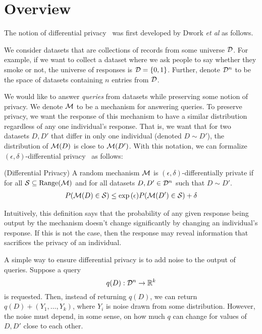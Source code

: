 \documentclass{article} %
\begin{document}
\section{Overview}\label{overview}
The notion of differential privacy~\cite{dwork2006calibrating} was first
developed by Dwork \emph{et al} as follows.


We consider datasets that are collections of records from some universe $\mathcal{D}$.
For example, if we want to collect a dataset where we ask people to say whether
they smoke or not, the universe of responses is $\mathcal{D} = \{0, 1\}$. Further,
denote $\mathcal{D}^n$ to be the space of datasets containing $n$ entries from $\mathcal{D}$.

We would like to answer \textit{queries} from datasets while preserving some
notion of privacy. We denote $\mathcal{M}$ to be a mechanism for answering
queries. To preserve privacy, we want the response of this mechanism
to have a similar distribution regardless of any one individual's response.
That is, we want that for two datasets $D, D'$ that differ in only one
individual (denoted $D \sim D'$), the distribution of $\mathcal{M}(D)$ is close to
$\mathcal{M}(D')$. With this notation, we can formalize $(\epsilon,
\delta)$-differential privacy~\cite{dwork2014algorithmic} as follows:

\begin{definition}{(Differential Privacy)}
A random mechanism $\mathcal{M}$ is $(\epsilon, \delta)$-differentially private
if for all $\mathcal{S} \subseteq \textup{Range}(\mathcal{M})$ and for all
datasets $D, D' \in \mathcal{D}^n$ such that $D \sim D'$.
\begin{align*}
P(\mathcal{M}(D) \in \mathcal{S}) \leq \exp{(\epsilon)} P(\mathcal{M}(D') \in \mathcal{S}) + \delta
\end{align*}
\end{definition}

Intuitively, this definition says that the probability of any given response
being output by the mechanism doesn't change significantly by changing an
individual's response. If this is not the case, then the response may reveal
information that sacrifices the privacy of an individual.

A simple way to ensure differential privacy is to add noise to the
output of queries. Suppose a query
\[ q(D) : \mathcal{D}^n \rightarrow \mathbb{R}^k \]
is requested. Then, instead of returning $q(D)$, we can return
$q(D) + (Y_1, \dots, Y_k)$, where $Y_i$ is noise drawn from some distribution.
However, the noise must depend, in some sense, on how much $q$ can change for
values of $D, D'$ close to each other.
\end{document}
